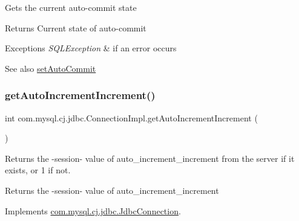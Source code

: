 Gets the current auto-\/commit state

\begin{DoxyReturn}{Returns}
Current state of auto-\/commit 
\end{DoxyReturn}

\begin{DoxyExceptions}{Exceptions}
{\em S\+Q\+L\+Exception} & if an error occurs \\
\hline
\end{DoxyExceptions}
\begin{DoxySeeAlso}{See also}
\mbox{\hyperlink{classcom_1_1mysql_1_1cj_1_1jdbc_1_1_connection_impl_a53c90790a0e3d5c1ebae0278a15453be}{set\+Auto\+Commit}} 
\end{DoxySeeAlso}
\mbox{\label{classcom_1_1mysql_1_1cj_1_1jdbc_1_1_connection_impl_a47d3fb6ffbaaff0190ea15e3c35d7270}} 
\subsubsection{\texorpdfstring{get\+Auto\+Increment\+Increment()}{getAutoIncrementIncrement()}}
{\footnotesize\ttfamily int com.\+mysql.\+cj.\+jdbc.\+Connection\+Impl.\+get\+Auto\+Increment\+Increment (\begin{DoxyParamCaption}{ }\end{DoxyParamCaption})}

Returns the -\/session-\/ value of \textquotesingle{}auto\+\_\+increment\+\_\+increment\textquotesingle{} from the server if it exists, or \textquotesingle{}1\textquotesingle{} if not.

\begin{DoxyReturn}{Returns}
the -\/session-\/ value of \textquotesingle{}auto\+\_\+increment\+\_\+increment\textquotesingle{} 
\end{DoxyReturn}


Implements \mbox{\hyperlink{interfacecom_1_1mysql_1_1cj_1_1jdbc_1_1_jdbc_connection_a06ded1274e682178c67fdb86f09fed5a}{com.\+mysql.\+cj.\+jdbc.\+Jdbc\+Connection}}.

\mbox{\label{classcom_1_1mysql_1_1cj_1_1jdbc_1_1_connection_impl_a8c812f82a9cb453fa511263b0c024362}} 
